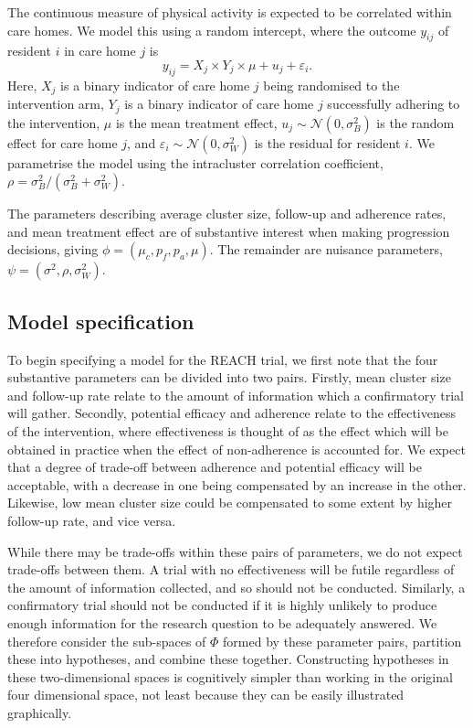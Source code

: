 \documentclass[AMA,STIX1COL]{WileyNJD-v2}
\begin{document}
The continuous measure of physical activity is expected to be correlated within care homes. We model this using a random intercept, where the outcome $y_{ij}$ of resident $i$ in care home $j$ is
\begin{equation}
y_{ij} = X_{j} \times Y_{j} \times \mu + u_{j} + \varepsilon_{i}.
\end{equation}
Here, $X_{j}$ is a binary indicator of care home $j$ being randomised to the intervention arm, $Y_{j}$ is a binary indicator of care home $j$ successfully adhering to the intervention, $\mu$ is the mean treatment effect, $u_{j} \sim \mathcal{N}(0, \sigma_{B}^{2})$ is the random effect for care home $j$, and $\varepsilon_{i} \sim \mathcal{N}(0, \sigma_{W}^{2})$ is the residual for resident $i$. We parametrise the model using the intracluster correlation coefficient, $\rho = \sigma_{B}^{2} / (\sigma_{B}^{2} + \sigma_{W}^{2})$.

The parameters describing average cluster size, follow-up and adherence rates, and mean treatment effect are of substantive interest when making progression decisions, giving $\phi = (\mu_c, p_f, p_a, \mu)$. The remainder are nuisance parameters, $\psi = (\sigma^2, \rho, \sigma_W^2)$.

\subsection{Model specification}

To begin specifying a model for the REACH trial, we first note that the four substantive parameters can be divided into two pairs. Firstly, mean cluster size and follow-up rate relate to the amount of information which a confirmatory trial will gather. Secondly, potential efficacy and adherence relate to the effectiveness of the intervention, where effectiveness is thought of as the effect which will be obtained in practice when the effect of non-adherence is accounted for. We expect that a degree of trade-off between adherence and potential efficacy will be acceptable, with a decrease in one being compensated by an increase in the other. Likewise, low mean cluster size could be compensated to some extent by higher follow-up rate, and vice versa. 

While there may be trade-offs within these pairs of parameters, we do not expect trade-offs between them. A trial with no effectiveness will be futile regardless of the amount of information collected, and so should not be conducted. Similarly, a confirmatory trial should not be conducted if it is highly unlikely to produce enough information for the research question to be adequately answered. We therefore consider the sub-spaces of $\Phi$ formed by these parameter pairs, partition these into hypotheses, and combine these together. Constructing hypotheses in these two-dimensional spaces is cognitively simpler than working in the original four dimensional space, not least because they can be easily illustrated graphically.
\end{document}
